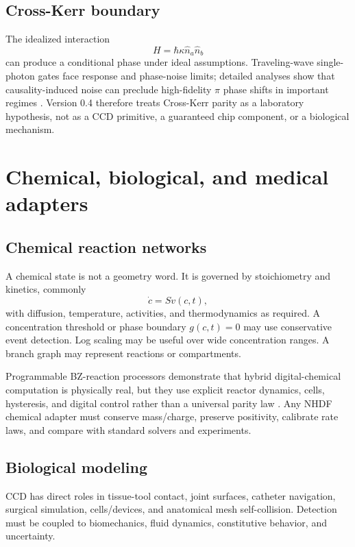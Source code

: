 \documentclass[11pt,a4paper,openany]{book}
\begin{document}
\section{Cross-Kerr boundary}
The idealized interaction
\begin{equation}
H=\hbar\kappa\hat n_a\hat n_b
\end{equation}
can produce a conditional phase under ideal assumptions. Traveling-wave single-photon gates face response and phase-noise limits; detailed analyses show that causality-induced noise can preclude high-fidelity $\pi$ phase shifts in important regimes \citep{dove2014kerr}. Version 0.4 therefore treats Cross-Kerr parity as a laboratory hypothesis, not as a CCD primitive, a guaranteed chip component, or a biological mechanism.

\chapter{Chemical, biological, and medical adapters}
\section{Chemical reaction networks}
A chemical state is not a geometry word. It is governed by stoichiometry and kinetics, commonly
\begin{equation}
\dot c=S v(c,t),
\end{equation}
with diffusion, temperature, activities, and thermodynamics as required. A concentration threshold or phase boundary $g(c,t)=0$ may use conservative event detection. Log scaling may be useful over wide concentration ranges. A branch graph may represent reactions or compartments.

Programmable BZ-reaction processors demonstrate that hybrid digital-chemical computation is physically real, but they use explicit reactor dynamics, cells, hysteresis, and digital control rather than a universal parity law \citep{sharma2024chemical}. Any NHDF chemical adapter must conserve mass/charge, preserve positivity, calibrate rate laws, and compare with standard solvers and experiments.

\section{Biological modeling}
CCD has direct roles in tissue-tool contact, joint surfaces, catheter navigation, surgical simulation, cells/devices, and anatomical mesh self-collision. Detection must be coupled to biomechanics, fluid dynamics, constitutive behavior, and uncertainty.
\end{document}
